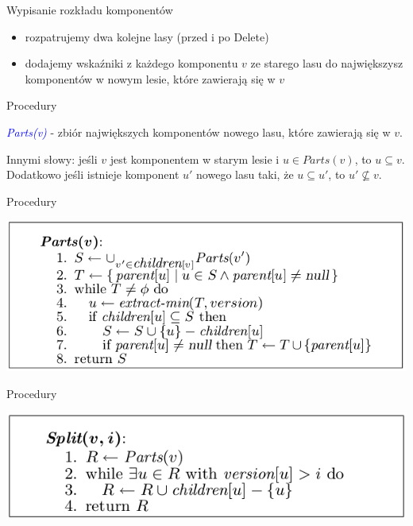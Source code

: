 \documentclass{beamer}
\newcommand{\emp}[1]{\textcolor{blue}{\textit{#1}}}
\begin{document}
\begin{frame}{Wypisanie rozkładu komponentów}

\begin{itemize}
\item rozpatrujemy dwa kolejne lasy (przed i po Delete)
\item dodajemy wskaźniki z każdego komponentu $v$ ze starego lasu do największysz komponentów w nowym lesie, które zawierają się w $v$
\end{itemize}

\end{frame}

\begin{frame}{Procedury}

\emp{Parts(v)} - zbiór największych komponentów nowego lasu, które zawierają się w $v$.

\vspace{0.5cm}

Innymi słowy: jeśli $v$ jest komponentem w starym lesie i $u \in Parts(v)$, to $u \subseteq v$. Dodatkowo jeśli istnieje komponent $u'$ nowego lasu taki, że $u \subseteq u'$, to $u' \not\subseteq v$.

\end{frame}

\begin{frame}{Procedury}
\begin{center}
\includegraphics[scale=0.4]{img/Parts.png}
\end{center}
\end{frame}

\begin{frame}{Procedury}
\begin{center}
\includegraphics[scale=0.4]{img/Split.png}
\end{center}
\end{frame}
\end{document}
